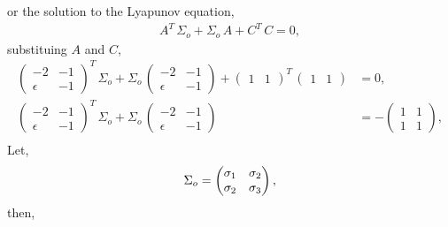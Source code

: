 or the solution to the Lyapunov equation,
\begin{align*}
    A^T\,\Sigma_o + \Sigma_o\,A + C^T\,C = 0,
\end{align*}
substituing $A$ and $C$, 
\begin{align*}
    \begin{pmatrix}
        -2 & -1 \\
        \epsilon & -1
    \end{pmatrix}^T\,\Sigma_o + \Sigma_o\,\begin{pmatrix}
        -2 & -1 \\
        \epsilon & -1
    \end{pmatrix} + \begin{pmatrix}
        1 & 1
    \end{pmatrix}^T\,\begin{pmatrix}
        1 & 1
    \end{pmatrix} &= 0,\\
    \begin{pmatrix}
        -2 & -1 \\
        \epsilon & -1
    \end{pmatrix}^T\,\Sigma_o + \Sigma_o\,\begin{pmatrix}
        -2 & -1 \\
        \epsilon & -1
    \end{pmatrix} &= - \begin{pmatrix}
        1 & 1 \\
        1 & 1
    \end{pmatrix},\\
\end{align*}
Let, 
\begin{align*}
    \Sigma_o = \begin{pmatrix} \sigma_{1} & \sigma_{2} \\ \sigma_{2} & \sigma_{3} \end{pmatrix},
\end{align*}
then, 
